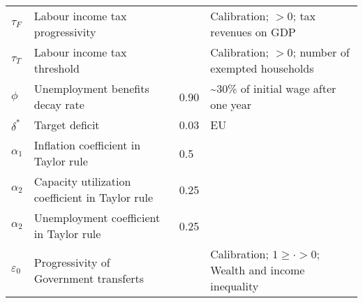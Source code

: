 \documentclass[a4paper, headings=standardclasses]{scrartcl}
\begin{document}
\begin{xltabular}{\linewidth}{lXlX}
    $\tau_F$                     & Labour income tax progressivity                              &       & Calibration; $>0$; tax revenues on GDP                                                                                                                                                           \\
    $\tau_T$                     & Labour income tax threshold                                  &       & Calibration; $>0$; number of exempted households                                                                                                                                                             \\
    $\phi$                       & Unemployment benefits decay rate                             & 0.90  & \textasciitilde 30\% of initial wage after one year                                                                                                                                                            \\
    $\delta^*$                   & Target deficit                                               & 0.03  & EU                                                                                                                                                            \\
    $\alpha_1$                   & Inflation coefficient in Taylor rule                         & 0.5      &                                                                                                                                                             \\
    $\alpha_2$                   & Capacity utilization coefficient in Taylor rule              & 0.25      &                                                                                                                                                             \\
    $\alpha_2$                   & Unemployment coefficient in Taylor rule                      & 0.25      &                                                                                                                                                             \\
    $\varepsilon_0$                   & Progressivity of Government transferts                   &  & Calibration; $1 \ge \cdot > 0$; Wealth and income inequality                                                                                                                                                             \\

\end{xltabular}
\end{document}
